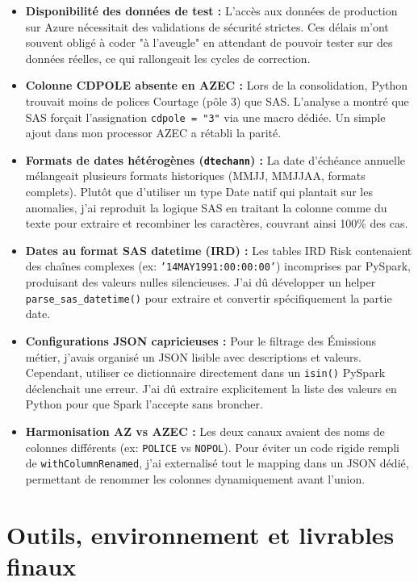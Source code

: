 \begin{itemize}
    \item \textbf{Disponibilité des données de test :} L'accès aux données de production sur Azure nécessitait des validations de sécurité strictes. Ces délais m'ont souvent obligé à coder "à l'aveugle" en attendant de pouvoir tester sur des données réelles, ce qui rallongeait les cycles de correction.
    \item \textbf{Colonne CDPOLE absente en AZEC :} Lors de la consolidation, Python trouvait moins de polices Courtage (pôle 3) que SAS. L'analyse a montré que SAS forçait l'assignation \texttt{cdpole = "3"} via une macro dédiée. Un simple ajout dans mon processor AZEC a rétabli la parité.
    \item \textbf{Formats de dates hétérogènes (\texttt{dtechann}) :} La date d'échéance annuelle mélangeait plusieurs formats historiques (MMJJ, MMJJAA, formats complets). Plutôt que d'utiliser un type Date natif qui plantait sur les anomalies, j'ai reproduit la logique SAS en traitant la colonne comme du texte pour extraire et recombiner les caractères, couvrant ainsi 100\% des cas.
    \item \textbf{Dates au format SAS datetime (IRD) :} Les tables IRD Risk contenaient des chaînes complexes (ex: \texttt{'14MAY1991:00:00:00'}) incomprises par PySpark, produisant des valeurs nulles silencieuses. J'ai dû développer un helper \texttt{parse\_sas\_datetime()} pour extraire et convertir spécifiquement la partie date.
    \item \textbf{Configurations JSON capricieuses :} Pour le filtrage des Émissions métier, j'avais organisé un JSON lisible avec descriptions et valeurs. Cependant, utiliser ce dictionnaire directement dans un \texttt{isin()} PySpark déclenchait une erreur. J'ai dû extraire explicitement la liste des valeurs en Python pour que Spark l'accepte sans broncher.
    \item \textbf{Harmonisation AZ vs AZEC :} Les deux canaux avaient des noms de colonnes différents (ex: \texttt{POLICE} vs \texttt{NOPOL}). Pour éviter un code rigide rempli de \texttt{withColumnRenamed}, j'ai externalisé tout le mapping dans un JSON dédié, permettant de renommer les colonnes dynamiquement avant l'union.
\end{itemize}

\section{Outils, environnement et livrables finaux}

